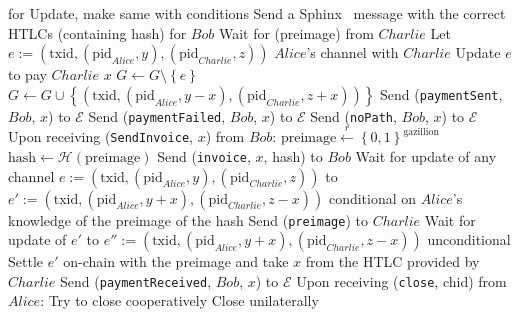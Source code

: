 \begin{algorithmic}[1]
{        for Update, make same with conditions}
        \State Send a Sphinx~\cite{sphinx} message with the correct HTLCs
        (containing hash) for $Bob$
        \State {}
        \State Wait for (preimage) from $Charlie$
          \State Let $e := \left(\mathrm{txid}, \left(\mathrm{pid}_{Alice},
          y\right), \left(\mathrm{pid}_{Charlie}, z\right)\right)$ $Alice$'s
          channel with $Charlie$
          \State Update $e$ to pay $Charlie$ $x$ 
          \State $G \leftarrow G \setminus \left\{e\right\}$
          \State $G \leftarrow G \cup \left\{\left(\mathrm{txid},
          \left(\mathrm{pid}_{Alice}, y - x\right),
          \left(\mathrm{pid}_{Charlie}, z + x\right)\right)\right\}$
          \State Send (\texttt{paymentSent}, $Bob$, $x$) to $\mathcal{E}$
        \Else
          \State Send (\texttt{paymentFailed}, $Bob$, $x$) to $\mathcal{E}$
        \EndIf
      \Else {}
        \State Send (\texttt{noPath}, $Bob$, $x$) to $\mathcal{E}$
      \EndIf
    \State
    \State Upon receiving (\texttt{SendInvoice}, $x$) from $Bob$:
      \State $\mathrm{preimage} \overset{r}{\leftarrow}
      \left\{0,1\right\}^{\mathrm{gazillion}}$
      \State $\mathrm{hash} \leftarrow
      \mathcal{H}\left(\mathrm{preimage}\right)$
      \State Send (\texttt{invoice}, $x$, hash) to $Bob$
      \State Wait for update of any channel $e := \left(\mathrm{txid},
      \left(\mathrm{pid}_{Alice}, y\right), \left(\mathrm{pid}_{Charlie},
      z\right)\right)$ to $e' := \left(\mathrm{txid},
      \left(\mathrm{pid}_{Alice}, y + x\right), \left(\mathrm{pid}_{Charlie}, z
      - x\right)\right)$ conditional on $Alice$'s knowledge of the preimage of
      the hash
      \State Send (\texttt{preimage}) to $Charlie$
      \State Wait for update of $e'$ to $e'' := \left(\mathrm{txid},
      \left(\mathrm{pid}_{Alice}, y + x\right), \left(\mathrm{pid}_{Charlie}, z
      - x\right)\right)$ unconditional
        \State Settle $e'$ on-chain with the preimage and take $x$ from the HTLC
        provided by $Charlie$
      \EndIf
      \State Send (\texttt{paymentReceived}, $Bob$, $x$) to $\mathcal{E}$
    \State
    \State Upon receiving (\texttt{close}, chid) from $Alice$:
        \State Try to close cooperatively 
         
          \State Close unilaterally 
        \EndIf
      \EndIf
  \end{algorithmic}
